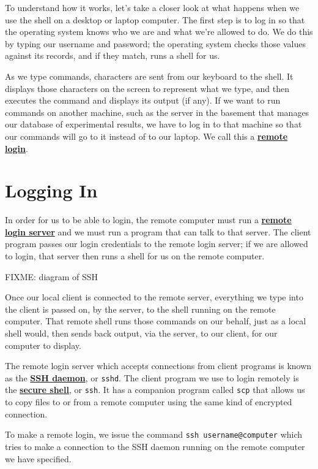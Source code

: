 \documentclass[
]{krantz}
\newcommand{\gref}[2]{\hyperlink{#2}{\textbf{#1}}}
\begin{document}
To understand how it works,
let's take a closer look at what happens when we use the shell
on a desktop or laptop computer.
The first step is to log in
so that the operating system knows who we are and what we're allowed to do.
We do this by typing our username and password;
the operating system checks those values against its records,
and if they match,
runs a shell for us.

As we type commands,
characters are sent from our keyboard to the shell.
It displays those characters on the screen to represent what we type,
and then executes the command and displays its output (if any).
If we want to run commands on another machine,
such as the server in the basement that manages our database of experimental results,
we have to log in to that machine so that our commands will go to it instead of to our laptop.
We call this a \gref{remote login}{remote\_login}.

\hypertarget{ssh-login}{%
\section{Logging In}\label{ssh-login}}

In order for us to be able to login,
the remote computer must run a \gref{remote login server}{remote\_login\_server}
and we must run a program that can talk to that server.
The client program passes our login credentials to the remote login server;
if we are allowed to login,
that server then runs a shell for us on the remote computer.

FIXME: diagram of SSH

Once our local client is connected to the remote server,
everything we type into the client is passed on, by the server, to the shell
running on the remote computer.
That remote shell runs those commands on our behalf,
just as a local shell would,
then sends back output, via the server, to our client, for our computer to display.

The remote login server which accepts connections from client programs
is known as the \gref{SSH daemon}{ssh\_daemon}, or \texttt{sshd}.
The client program we use to login remotely is the \gref{secure shell}{ssh\_glossary},
or \texttt{ssh}.
It has a companion program called \texttt{scp}
that allows us to copy files to or from a remote computer using the same kind of encrypted connection.

To make a remote login, we issue the command \texttt{ssh\ username@computer}
which tries to make a connection to the SSH daemon running on the remote computer we have specified.
\end{document}
